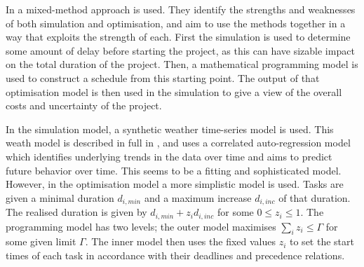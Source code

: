 \documentclass[a4paper,12pt]{article}
\begin{document}
\bigskip

In \cite{barlow2018mixed} a mixed-method approach is used. They identify the strengths and weaknesses of both simulation and optimisation, and aim to use the methods together in a way that exploits the strength of each. First the simulation is used to determine some amount of delay before starting the project, as this can have sizable impact on the total duration of the project. Then, a mathematical programming model is used to construct a schedule from this starting point. The output of that optimisation model is then used in the simulation to give a view of the overall costs and uncertainty of the project. 

In the simulation model, a synthetic weather time-series model is used. This weath model is described in full in \cite{dinwoodie2014operational} , and uses a correlated auto-regression model which identifies underlying trends in the data over time and aims to predict future behavior over time. This seems to be a fitting and sophisticated model. However, in the optimisation model a more simplistic model is used. Tasks are given a minimal duration $d_{i, min}$ and a maximum increase $d_{i, inc}$ of that duration. The realised duration is given by $d_{i,  min} + z_i d_{i, inc}$ for some $0 \leq z_i \leq 1$. The programming model has two levels; the outer model maximises $\sum_i z_i \leq \Gamma$ for some given limit $\Gamma$. The inner model then uses the fixed values $z_i$ to set the start times of each task in accordance with their deadlines and precedence relations. 
\end{document}

